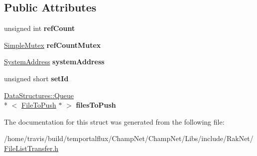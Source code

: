 \subsection*{Public Attributes}
\begin{DoxyCompactItemize}
\item 
\hypertarget{struct_rak_net_1_1_file_list_transfer_1_1_file_to_push_recipient_ae0c4ab00bc6810102f7b1a1e8cefec9c}{unsigned int {\bfseries ref\-Count}}\label{struct_rak_net_1_1_file_list_transfer_1_1_file_to_push_recipient_ae0c4ab00bc6810102f7b1a1e8cefec9c}

\item 
\hypertarget{struct_rak_net_1_1_file_list_transfer_1_1_file_to_push_recipient_a6503ddef1160dbc79ffa8f3b5218b96d}{\hyperlink{class_rak_net_1_1_simple_mutex}{Simple\-Mutex} {\bfseries ref\-Count\-Mutex}}\label{struct_rak_net_1_1_file_list_transfer_1_1_file_to_push_recipient_a6503ddef1160dbc79ffa8f3b5218b96d}

\item 
\hypertarget{struct_rak_net_1_1_file_list_transfer_1_1_file_to_push_recipient_adbe2171608a342bf742cf64c988ab80c}{\hyperlink{struct_rak_net_1_1_system_address}{System\-Address} {\bfseries system\-Address}}\label{struct_rak_net_1_1_file_list_transfer_1_1_file_to_push_recipient_adbe2171608a342bf742cf64c988ab80c}

\item 
\hypertarget{struct_rak_net_1_1_file_list_transfer_1_1_file_to_push_recipient_ac4633b7970d7e41af69246fcd8ea9e8f}{unsigned short {\bfseries set\-Id}}\label{struct_rak_net_1_1_file_list_transfer_1_1_file_to_push_recipient_ac4633b7970d7e41af69246fcd8ea9e8f}

\item 
\hypertarget{struct_rak_net_1_1_file_list_transfer_1_1_file_to_push_recipient_a2de181ba4b51df574d4fc832c4dd7d4c}{\hyperlink{class_data_structures_1_1_queue}{Data\-Structures\-::\-Queue}\\*
$<$ \hyperlink{struct_rak_net_1_1_file_list_transfer_1_1_file_to_push}{File\-To\-Push} $\ast$ $>$ {\bfseries files\-To\-Push}}\label{struct_rak_net_1_1_file_list_transfer_1_1_file_to_push_recipient_a2de181ba4b51df574d4fc832c4dd7d4c}

\end{DoxyCompactItemize}


The documentation for this struct was generated from the following file\-:\begin{DoxyCompactItemize}
\item 
/home/travis/build/temportalflux/\-Champ\-Net/\-Champ\-Net/\-Libs/include/\-Rak\-Net/\hyperlink{_file_list_transfer_8h}{File\-List\-Transfer.\-h}\end{DoxyCompactItemize}
